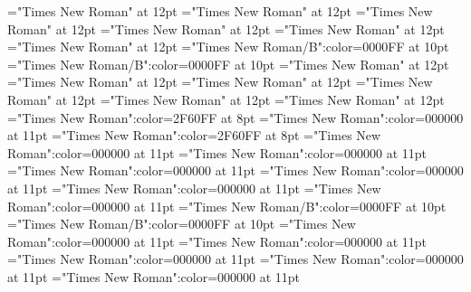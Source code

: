 \documentclass[a4paper]{article}
\begin{document}
\font\xitemptdefinitionLcptsensesensesentrybletDatadicBody="Times New Roman" at 12pt
\font{}="Times New Roman" at 12pt
\font\partofspeechptgrammaticalinfosensesensesentrybletDatadicBody="Times New Roman" at 12pt
\font\grammaticalinfosensesensesentrybletDatadicBody="Times New Roman" at 12pt
\font\sensesensesentrybletDatadicBody="Times New Roman" at 12pt
\font\sensesentrybletDatadicBody="Times New Roman" at 12pt
\font\headwordafterentrybletDatadicBody="Times New Roman/B":color=0000FF at 10pt
\font\headwordsehentrybletDatadicBody="Times New Roman/B":color=0000FF at 10pt
\font\CmPicturepublishStemCaptionCaptionPubptpictureCaptionpictureRightentrybletDatadicBody="Times New Roman" at 12pt
\font\CmPicturepublishStemCaptionSenseNumberpictureCaptionpictureRightentrybletDatadicBody="Times New Roman" at 12pt
\font\pictureCaptionpictureRightentrybletDatadicBody="Times New Roman" at 12pt
\font\picturepictureRightentrybletDatadicBody="Times New Roman" at 12pt
\font\pictureRightentrybletDatadicBody="Times New Roman" at 12pt
\font\entrybletDatadicBody="Times New Roman" at 12pt
\font\xlanguagetagenxitemendefinitionLcptsensesensesentryletDatadicBody="Times New Roman":color=2F60FF at 8pt
\font\xitemendefinitionLcptsensesensesentryletDatadicBody="Times New Roman":color=000000 at 11pt
\font\xlanguagetagenxitemptdefinitionLcptsensesensesentryletDatadicBody="Times New Roman":color=2F60FF at 8pt
\font\xitemptdefinitionLcptsensesensesentryletDatadicBody="Times New Roman":color=000000 at 11pt
\font{}="Times New Roman":color=000000 at 11pt
\font\partofspeechptgrammaticalinfosensesensesentryletDatadicBody="Times New Roman":color=000000 at 11pt
\font\grammaticalinfosensesensesentryletDatadicBody="Times New Roman":color=000000 at 11pt
\font\sensesensesentryletDatadicBody="Times New Roman":color=000000 at 11pt
\font\sensesentryletDatadicBody="Times New Roman":color=000000 at 11pt
\font\headwordafterentryletDatadicBody="Times New Roman/B":color=0000FF at 10pt
\font\headwordsehentryletDatadicBody="Times New Roman/B":color=0000FF at 10pt
\font\CmPicturepublishStemCaptionCaptionPubptpictureCaptionpictureRightentryletDatadicBody="Times New Roman":color=000000 at 11pt
\font\CmPicturepublishStemCaptionSenseNumberpictureCaptionpictureRightentryletDatadicBody="Times New Roman":color=000000 at 11pt
\font\pictureCaptionpictureRightentryletDatadicBody="Times New Roman":color=000000 at 11pt
\font\picturepictureRightentryletDatadicBody="Times New Roman":color=000000 at 11pt
\font\pictureRightentryletDatadicBody="Times New Roman":color=000000 at 11pt
\end{document}

